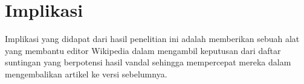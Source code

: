 \section{Implikasi}\label{sec:implikasi}

Implikasi yang didapat dari hasil penelitian ini adalah memberikan sebuah alat yang membantu editor Wikipedia dalam mengambil keputusan dari daftar suntingan yang berpotensi hasil vandal sehingga mempercepat mereka dalam mengembalikan artikel ke versi sebelumnya.